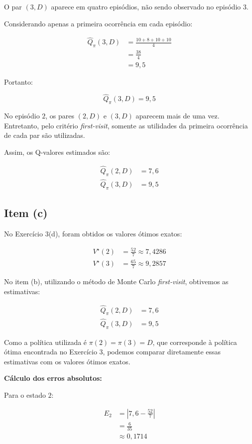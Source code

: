 O par $(3,D)$ aparece em quatro episódios,
não sendo observado no episódio $3$.

Considerando apenas a primeira ocorrência
em cada episódio:

\[
\begin{aligned}
\hat{Q}_{\pi}(3,D)
&=\frac{10+8+10+10}{4}\\
&=\frac{38}{4}\\
&=9{,}5
\end{aligned}
\]

Portanto:

\[
\boxed{\hat{Q}_{\pi}(3,D)=9{,}5}
\]

No episódio $2$, os pares $(2,D)$ e $(3,D)$
aparecem mais de uma vez. Entretanto,
pelo critério \textit{first-visit},
somente as utilidades da primeira ocorrência
de cada par são utilizadas.

Assim, os Q-valores estimados são:

\[
\boxed{
\begin{aligned}
\hat{Q}_{\pi}(2,D)&=7{,}6\\
\hat{Q}_{\pi}(3,D)&=9{,}5
\end{aligned}
}
\]


\subsection{Item (c)}

No Exercício 3(d), foram obtidos os
valores ótimos exatos:

\[
\begin{aligned}
V^\star(2)&=\frac{52}{7}\approx7{,}4286\\
V^\star(3)&=\frac{65}{7}\approx9{,}2857
\end{aligned}
\]

No item (b), utilizando o método de
Monte Carlo \textit{first-visit},
obtivemos as estimativas:

\[
\begin{aligned}
\hat{Q}_{\pi}(2,D)&=7{,}6\\
\hat{Q}_{\pi}(3,D)&=9{,}5
\end{aligned}
\]

Como a política utilizada é
$\pi(2)=\pi(3)=D$, que corresponde
à política ótima encontrada no
Exercício 3, podemos comparar
diretamente essas estimativas com
os valores ótimos exatos.

\textbf{Cálculo dos erros absolutos:}

Para o estado $2$:

\[
\begin{aligned}
E_2
&=\left|7{,}6-\frac{52}{7}\right|\\
&=\frac{6}{35}\\
&\approx0{,}1714
\end{aligned}
\]

